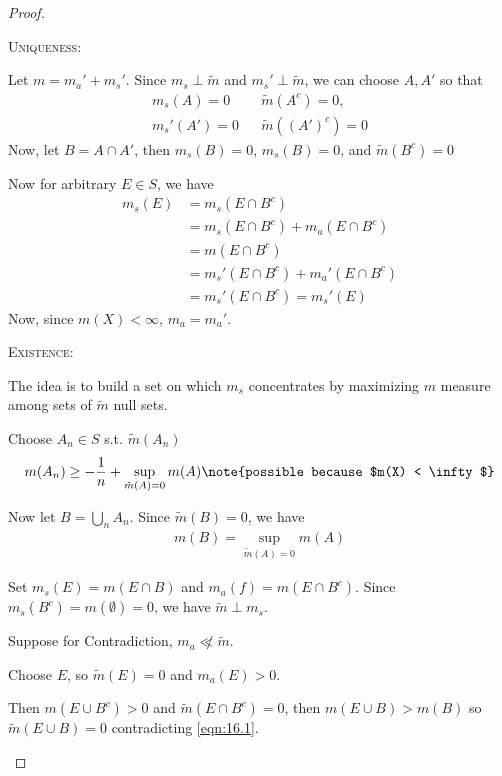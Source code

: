 \begin{proof} \phantom{.} \hfill
	\begin{steps}
	\item \textsc{Uniqueness:} \par
			Let $m = m_{a}' + m_{s}'$.
			Since $m_{s} \perp \tilde m$ and $m_{s}' \perp \tilde m$, we can choose
			$A , A'$ so that
      \begin{align*}
        m_s (A) = 0    && \tilde m (A^{c}) = 0, \\
        m_s' (A') = 0  && \tilde m ( (A')^c) = 0
			\end{align*}
			Now, let $B = A \cap A'$, then  $m_s (B) = 0$, $m_s (B) = 0$, and $\tilde m(B^c) = 0$

			Now for arbitrary $E \in S$, we have
			\begin{align*}
				m_s (E) &= m_s ( E \cap B^c) \\
						&= m_s (E \cap B^c) + m_a (E \cap B^c) \\
						&= m (E \cap B^c) \\
						&= m_s' (E \cap B^c) + m_a' (E \cap B^c) \\
						&= m_s' (E \cap B^c) = m_s'(E)
			\end{align*}
			Now, since $m (X) < \infty$, $m_a = m_a'$.
		\item \textsc{Existence:}

			The idea is to build a set on which $m_s$ concentrates by maximizing $m$ measure among sets of $\tilde m$ null sets.

			Choose $A_{n} \in S$ s.t. $ \tilde m (A_{n})$
			\begin{align*}
        m(A_{n}) \geq -\frac{1}{n} + \sup_{\tilde{m} (A) = 0} m(A)\note{possible because $m(X) < \infty$}
			\end{align*} 


			Now let  $B = \bigcup_{n} A_{n}$. Since $\tilde m (B) = 0$, we have
      \begin{align}\label{eqn:16.1}
				m(B) = \sup_{\tilde m (A) = 0} m (A)
			\end{align}

			Set $m_s (E) = m (E \cap B)$ and $m_a (f) = m (E \cap B^c)$.
			Since  $m_s (B^c) = m( \emptyset) = 0$, we have $\tilde m \perp m_s$.


			Suppose for Contradiction, $m_a \not \ll \tilde m$.

			Choose $E$, so $\tilde m (E) = 0$ and $m_a (E) > 0$.

			Then $m(E \cup B^c) > 0$ and $\tilde m (E \cap B^c) = 0$, then
			$m(E \cup B) > m (B)$
      so  $\tilde m (E \cup B) = 0$ contradicting \ref{eqn:16.1}.
	\end{steps}
\end{proof}

